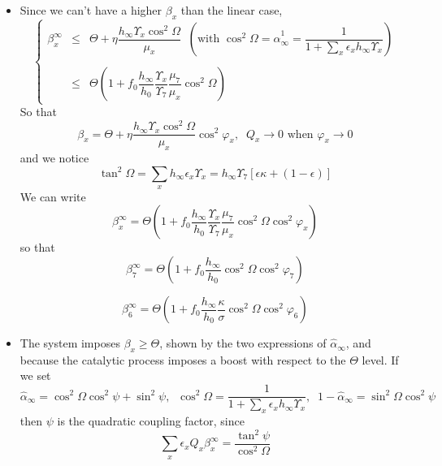 \documentclass[aps,onecolumn,10pt]{revtex4}
\begin{document}
\begin{itemize}
\item Since we can't have a higher $\beta_x$ than the linear case,
\begin{equation}
\left\lbrace
\begin{array}{rcl}
\beta_x^\infty & \leq & \Theta + \eta \dfrac{h_\infty\Upsilon_x\cos^2\Omega}{\mu_x}\;\;\left(\text{with }\cos^2\Omega=\hat\alpha_\infty^1=\dfrac{1}{1+\sum_x\epsilon_x h_\infty \Upsilon_x}\right)\\
\\
&\leq& \Theta\left(1+ f_0 \dfrac{h_\infty}{h_0} \dfrac{\Upsilon_x}{\Upsilon_7}\dfrac{\mu_7}{\mu_x}\cos^2 \Omega \right)
\end{array}
\right.
\end{equation}
So that
\begin{equation}
	\beta_x = \Theta + \eta \dfrac{h_\infty\Upsilon_x\cos^2\Omega}{\mu_x} \cos^2 \varphi_x,\;\;Q_x\to0\text{ when }\varphi_x\to0
\end{equation}
and we notice
\begin{equation}
	\tan^2 \Omega = \sum_x h_\infty \epsilon_x \Upsilon_x = h_\infty \Upsilon_7 \left[\epsilon\kappa+(1-\epsilon)\right]
\end{equation}
We can write
\begin{equation}
	\beta_x^\infty = \Theta \left(1 + f_0 \dfrac{h_\infty}{h_0} \dfrac{\Upsilon_x}{\Upsilon_7}\dfrac{\mu_7}{\mu_x}\cos^2 \Omega\cos^2 \varphi_x\right)
\end{equation}
so that
\begin{equation}
	\beta_7^\infty = \Theta \left(1 + 
	f_0 \dfrac{h_\infty}{h_0} 	\cos^2\Omega \cos^2\varphi_7
	\right)
\end{equation}

\begin{equation}
	\beta_6^\infty = \Theta \left(1 + f_0 \dfrac{h_\infty}{h_0} \dfrac{\kappa}{\sigma}
	\cos^2\Omega \cos^2\varphi_6 
	\right)
\end{equation}


\item The system imposes $\beta_x\geq\Theta$, shown by the two expressions of $\hat\alpha_\infty$, and because the catalytic process imposes a boost with respect to the $\Theta$ level.
If we set
\begin{equation}
	\hat\alpha_\infty = \cos^2\Omega \cos^2\psi + \sin^2\psi, 
	\;\;\cos^2\Omega  = \dfrac{1}{1+\sum_x\epsilon_x h_\infty \Upsilon_x},\;\;1-\hat\alpha_\infty = \sin^2\Omega  \cos^2\psi
\end{equation}
then $\psi$ is the quadratic coupling factor, since
\begin{equation}
	\sum_x \epsilon_x Q_x \beta_x^\infty = \dfrac{\tan^2\psi}{\cos^2\Omega}
\end{equation}


\end{itemize}
\end{document}
